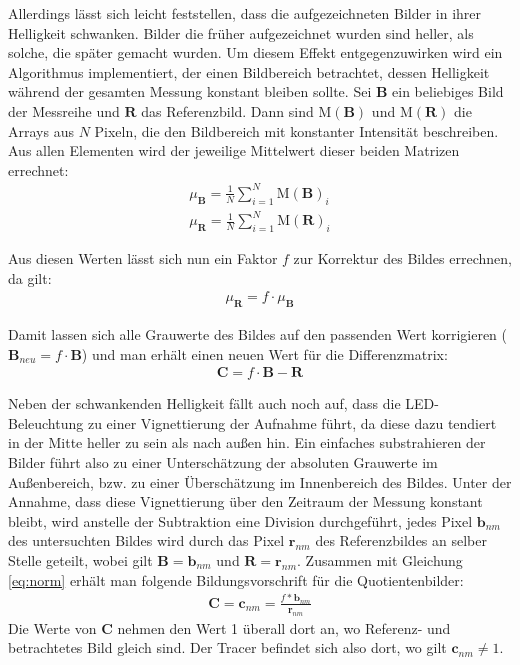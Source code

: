 Allerdings lässt sich leicht feststellen, dass die aufgezeichneten Bilder in ihrer Helligkeit schwanken. Bilder die früher aufgezeichnet wurden sind heller, als solche, die später gemacht wurden. Um diesem Effekt entgegenzuwirken wird ein Algorithmus implementiert, der einen Bildbereich betrachtet, dessen Helligkeit während der gesamten Messung konstant bleiben sollte. Sei $\mathbf{B}$ ein beliebiges Bild der Messreihe und $\mathbf{R}$ das Referenzbild. Dann sind $\mathrm{M(\mathbf{B})}$ und $\mathrm{M(\mathbf{R})}$ die Arrays aus $N$ Pixeln, die den Bildbereich mit konstanter Intensität beschreiben. Aus allen Elementen wird der jeweilige Mittelwert dieser beiden Matrizen errechnet:
\begin{eqnarray}
 \mu_{\mathbf{B}} = \frac{1}{N} \sum_{i=1}^N \mathrm{M(\mathbf{B})}_i \\
 \mu_{\mathbf{R}} = \frac{1}{N} \sum_{i=1}^N \mathrm{M(\mathbf{R})}_i
\end{eqnarray}

Aus diesen Werten lässt sich nun ein Faktor $f$ zur Korrektur des Bildes errechnen, da gilt:
\begin{eqnarray}
 \mu_{\mathbf{R}} = f \cdot \mu_{\mathbf{B}}
\end{eqnarray}

Damit lassen sich alle Grauwerte des Bildes auf den passenden Wert korrigieren ($\mathbf{B}_{neu} = f \cdot \mathbf{B}$) und man erhält einen neuen Wert für die Differenzmatrix:
\begin{eqnarray}
 \mathbf{C} = f \cdot \mathbf{B} - \mathbf{R}
 \label{eq:norm}
\end{eqnarray}


Neben der schwankenden Helligkeit fällt auch noch auf, dass die LED-Beleuchtung zu einer Vignettierung der Aufnahme führt, da diese dazu tendiert in der Mitte heller zu sein als nach außen hin. Ein einfaches substrahieren der Bilder führt also zu einer Unterschätzung der absoluten Grauwerte im Außenbereich, bzw. zu einer Überschätzung im Innenbereich des Bildes.
Unter der Annahme, dass diese Vignettierung über den Zeitraum der Messung konstant bleibt, wird anstelle der Subtraktion eine Division durchgeführt, \dah jedes Pixel $\mathbf{b}_{nm}$ des untersuchten Bildes wird durch das Pixel $\mathbf{r}_{nm}$ des Referenzbildes an selber Stelle geteilt, wobei gilt $\mathbf{B} = \mathbf{b}_{nm}$ und $\mathbf{R} = \mathbf{r}_{nm}$. Zusammen mit Gleichung \ref{eq:norm} erhält man folgende Bildungsvorschrift für die Quotientenbilder:
\begin{eqnarray}
 \mathbf{C} = \mathbf{c}_{nm} = \frac{f * \mathbf{b}_{nm}}{\mathbf{r}_{nm}}
 \label{eq:quot}
\end{eqnarray}
Die Werte von $\mathbf{C}$ nehmen den Wert 1 überall dort an, wo Referenz- und betrachtetes Bild gleich sind. Der Tracer befindet sich also dort, wo gilt $\mathbf{c}_{nm} \neq 1$.

